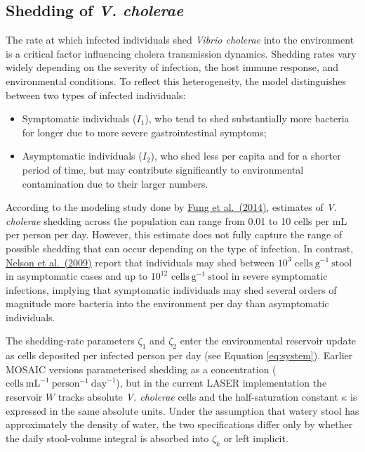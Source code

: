 \documentclass[
]{book}
\providecommand{\tightlist}{%
  \setlength{\itemsep}{0pt}\setlength{\parskip}{0pt}}
\begin{document}
\subsection{\texorpdfstring{Shedding of \emph{V. cholerae}}{Shedding of V. cholerae}}\label{sec:shedding}

The rate at which infected individuals shed \emph{Vibrio cholerae} into the environment is a critical factor influencing cholera transmission dynamics. Shedding rates vary widely depending on the severity of infection, the host immune response, and environmental conditions. To reflect this heterogeneity, the model distinguishes between two types of infected individuals:

\begin{itemize}
\tightlist
\item
  Symptomatic individuals (\(I_1\)), who tend to shed substantially more bacteria for longer due to more severe gastrointestinal symptoms;
\item
  Asymptomatic individuals (\(I_2\)), who shed less per capita and for a shorter period of time, but may contribute significantly to environmental contamination due to their larger numbers.
\end{itemize}

According to the modeling study done by \href{https://www.ncbi.nlm.nih.gov/pmc/articles/PMC3926264/}{Fung et al.~(2014)}, estimates of \emph{V. cholerae} shedding across the population can range from 0.01 to 10 cells per mL per person per day. However, this estimate does not fully capture the range of possible shedding that can occur depending on the type of infection. In contrast, \href{https://www.ncbi.nlm.nih.gov/pmc/articles/PMC3842031/}{Nelson et al.~(2009)} report that individuals may shed between \(10^3\) \(\text{cells}~\text{g}^{-1}~\text{stool}\) in asymptomatic cases and up to \(10^{12}\) \(\text{cells}~\text{g}^{-1}~\text{stool}\) in severe symptomatic infections, implying that symptomatic individuals may shed several orders of magnitude more bacteria into the environment per day than asymptomatic individuals.

The shedding-rate parameters \(\zeta_1\) and \(\zeta_2\) enter the environmental reservoir update as cells deposited per infected person per day (see Equation \eqref{eq:system}). Earlier MOSAIC versions parameterised shedding as a concentration (\(\text{cells}~\text{mL}^{-1}~\text{person}^{-1}~\text{day}^{-1}\)), but in the current LASER implementation the reservoir \(W\) tracks absolute \emph{V. cholerae} cells and the half-saturation constant \(\kappa\) is expressed in the same absolute units. Under the assumption that watery stool has approximately the density of water, the two specifications differ only by whether the daily stool-volume integral is absorbed into \(\zeta_k\) or left implicit.
\end{document}
